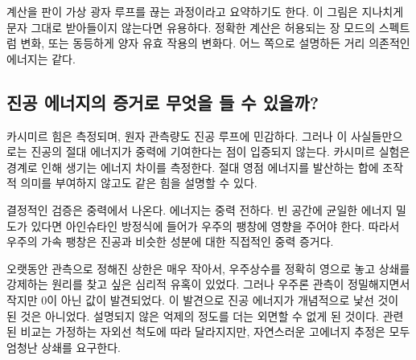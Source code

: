 계산을 판이 가상 광자 루프를 끊는 과정이라고 요약하기도 한다. 이 그림은 지나치게 문자 그대로 받아들이지 않는다면 유용하다. 정확한 계산은 허용되는 장 모드의 스펙트럼 변화, 또는 동등하게 양자 유효 작용의 변화다. 어느 쪽으로 설명하든 거리 의존적인 에너지는 같다.

\begin{classroomqa}
\end{classroomqa}

\subsection{진공 에너지의 증거로 무엇을 들 수 있을까?}

카시미르 힘은 측정되며, 원자 관측량도 진공 루프에 민감하다. 그러나 이 사실들만으로는 진공의 절대 에너지가 중력에 기여한다는 점이 입증되지 않는다. 카시미르 실험은 경계로 인해 생기는 에너지 차이를 측정한다. 절대 영점 에너지를 발산하는 합에 조작적 의미를 부여하지 않고도 같은 힘을 설명할 수 있다.

결정적인 검증은 중력에서 나온다. 에너지는 중력 전하다. 빈 공간에 균일한 에너지 밀도가 있다면 아인슈타인 방정식에 들어가 우주의 팽창에 영향을 주어야 한다. 따라서 우주의 가속 팽창은 진공과 비슷한 성분에 대한 직접적인 중력 증거다.

\begin{classroomqa}
\end{classroomqa}

오랫동안 관측으로 정해진 상한은 매우 작아서, 우주상수를 정확히 영으로 놓고 상쇄를 강제하는 원리를 찾고 싶은 심리적 유혹이 있었다. 그러나 우주론 관측이 정밀해지면서 작지만 0이 아닌 값이 발견되었다. 이 발견으로 진공 에너지가 개념적으로 낯선 것이 된 것은 아니었다. 설명되지 않은 억제의 정도를 더는 외면할 수 없게 된 것이다. 관련된 비교는 가정하는 자외선 척도에 따라 달라지지만, 자연스러운 고에너지 추정은 모두 엄청난 상쇄를 요구한다.

